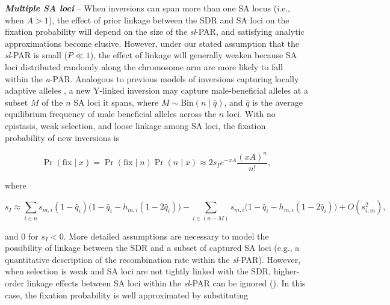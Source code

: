 \documentclass{article}
\begin{document}
 \vspace{12pt}

{\bf \itshape Multiple SA loci} -- When inversions can span more than one SA locus (i.e., when $A > 1$), the effect of prior linkage between the SDR and SA loci on the fixation probability will depend on the size of the {\itshape sl}-PAR, and satisfying analytic approximations become elusive. However, under our stated assumption that the {\itshape sl}-PAR is small ($P \ll 1$), the effect of linkage will generally weaken because SA loci distributed randomly along the chromosome arm are more likely to fall within the {\itshape a}-PAR. Analogous to previous models of inversions capturing locally adaptive alleles \citep{KirkpatrickBarton2003, Connallon2018}, a new Y-linked inversion may capture male-beneficial alleles at a subset $M$ of the $n$ SA loci it spans, where $M \sim \text{Bin}(n \mid \overline{q})$, and $\overline{q}$ is the average equilibrium frequency of male beneficial alleles across the $n$ loci. With no epistasis, weak selection, and loose linkage among SA loci, the fixation probability of new inversions is

\begin{equation}\label{eq:SApFixMultiLoc}
	\Pr(\text{fix} \mid x) = \Pr(\text{fix} \mid n) \Pr(n \mid x) \approx 2 s_I e^{-x A} \frac{(xA)^n}{n!},
\end{equation}

\noindent where

\begin{equation}\label{eq:SASIMultiLoc}
	s_I \approx \sum_{i \in n} s_{m,i} (1 - \hat{q}_{i}) \big( 1 - \hat{q}_i - h_{m,i} (1 - 2 \hat{q}_i) \big) - \sum_{i \in (n-M)} s_{m,i} \big( 1 - \hat{q}_i - h_{m,i} (1 - 2 \hat{q}_i) \big) + O(s_{i,m}^2),
\end{equation}

\noindent and $0$ for $s_I < 0$. More detailed assumptions are necessary to model the possibility of linkage between the SDR and a subset of captured SA loci (e.g., a quantitative description of the recombination rate within the {\itshape sl}-PAR). However, when selection is weak and SA loci are not tightly linked with the SDR, higher-order linkage effects between SA loci within the {\itshape sl}-PAR can be ignored (\citealt{Otto2019}). In this case, the fixation probability is well approximated by substituting 
\end{document}
